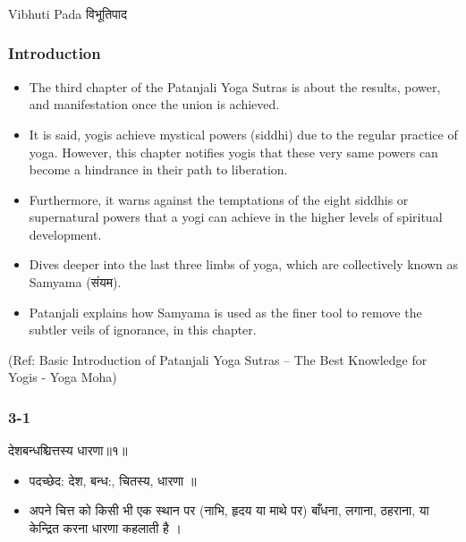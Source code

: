 \begin{frame}[fragile]\frametitle{}
\begin{center}
{\Large Vibhuti Pada विभूतिपाद}
\end{center}
\end{frame}


\begin{frame}[fragile]\frametitle{Introduction}


	\begin{itemize}
	\item The third chapter of the Patanjali Yoga Sutras is about the results, power, and manifestation once the union is achieved. 
		\item It is said, yogis achieve mystical powers (siddhi) due to the regular practice of yoga. However, this chapter notifies yogis that these very same powers can become a hindrance in their path to liberation. 
			\item Furthermore, it warns against the temptations of the eight siddhis or supernatural powers that a yogi can achieve in the higher levels of spiritual development.
	\item Dives deeper into the last three limbs of yoga, which are collectively known as Samyama (संयम).
	\item Patanjali explains how Samyama is used as the finer tool to remove the subtler veils of ignorance, in this chapter.
	\end{itemize}

\tiny{(Ref: Basic Introduction of Patanjali Yoga Sutras – The Best Knowledge for Yogis - Yoga Moha)}

\end{frame}

\begin{frame}[fragile]\frametitle{3-1}
\begin{sanskrit}
देशबन्धश्चित्तस्य धारणा॥१॥
\end{sanskrit}

\begin{itemize}
\item पदच्छेद: देश, बन्ध:, चितस्य‌, धारणा ‌॥
\item अपने चित्त को किसी भी एक स्थान पर (नाभि, हृदय या माथे पर) बाँधना, लगाना, ठहराना, या केन्द्रित करना धारणा कहलाती है ।
\end{itemize}
\end{frame}


